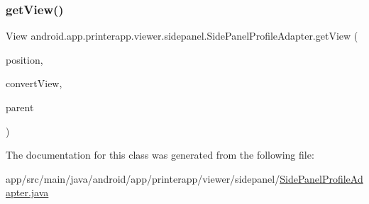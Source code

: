 \subsubsection{\texorpdfstring{get\+View()}{getView()}}
{\footnotesize\ttfamily View android.\+app.\+printerapp.\+viewer.\+sidepanel.\+Side\+Panel\+Profile\+Adapter.\+get\+View (\begin{DoxyParamCaption}\item[{int}]{position,  }\item[{View}]{convert\+View,  }\item[{View\+Group}]{parent }\end{DoxyParamCaption})}



The documentation for this class was generated from the following file\+:\begin{DoxyCompactItemize}
\item 
app/src/main/java/android/app/printerapp/viewer/sidepanel/\hyperlink{_side_panel_profile_adapter_8java}{Side\+Panel\+Profile\+Adapter.\+java}\end{DoxyCompactItemize}
